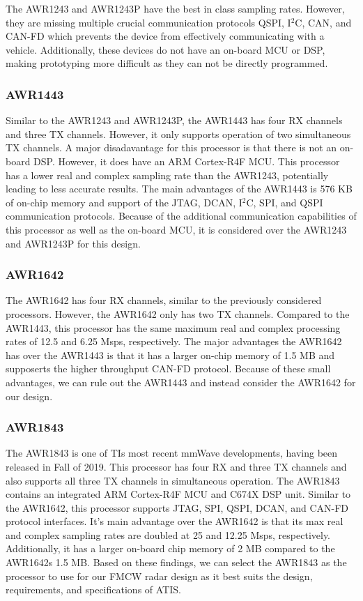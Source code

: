 \documentclass[11pt]{IEEEtran}
\begin{document}
				The AWR1243 and AWR1243P have the best in class sampling rates. However, they are missing multiple crucial communication protocols QSPI, I$^\text{2}$C, CAN, and CAN-FD which prevents the device from effectively communicating with a vehicle. Additionally, these devices do not have an on-board MCU or DSP, making prototyping more difficult as they can not be directly programmed.

			\subsubsection{AWR1443}
				Similar to the AWR1243 and AWR1243P, the AWR1443 \cite{awr1443,awr1443boost} has four RX channels and three TX channels. However, it only supports operation of two simultaneous TX channels. A major disadavantage for this processor is that there is not an on-board DSP.  However, it does have an ARM Cortex-R4F MCU. This processor has a lower real and complex sampling rate than the AWR1243, potentially leading to less accurate results. The main advantages of the AWR1443 is 576 KB of on-chip memory and support of the JTAG, DCAN, I$^\text{2}$C, SPI, and QSPI communication protocols. Because of the additional communication capabilities of this processor as well as the on-board MCU, it is considered over the AWR1243 and AWR1243P for this design.

			\subsubsection{AWR1642}
				The AWR1642 \cite{awr1642,awr1642boost} has four RX channels, similar to the previously considered processors. However, the AWR1642 only has two TX channels. Compared to the AWR1443, this processor has the same maximum real and complex processing rates of 12.5 and 6.25 Msps, respectively. The major advantages the AWR1642 has over the AWR1443 is that it has a larger on-chip memory of 1.5 MB and supposerts the higher throughput CAN-FD protocol. Because of these small advantages, we can rule out the AWR1443 and instead consider the AWR1642 for our design.

			\subsubsection{AWR1843}
				The AWR1843 \cite{awr1843,awr1843boost} is one of TIs most recent mmWave developments, having been released in Fall of 2019. This processor has four RX and three TX channels and also supports all three TX channels in simultaneous operation. The AWR1843 contains an integrated ARM Cortex-R4F MCU and C674X DSP unit. Similar to the AWR1642, this processor supports JTAG, SPI, QSPI, DCAN, and CAN-FD protocol interfaces. It's main advantage over the AWR1642 is that its max real and complex sampling rates are doubled at 25 and 12.25 Msps, respectively. Additionally, it has a larger on-board chip memory of 2 MB compared to the AWR1642s 1.5 MB. Based on these findings, we can select the AWR1843 as the processor to use for our FMCW radar design as it best suits the design, requirements, and specifications of ATIS. 
\end{document}
